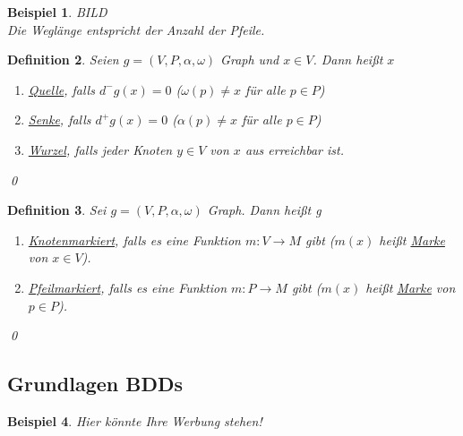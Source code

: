 \documentclass[ngerman]{scrartcl}
\theoremstyle{custom}
\newtheorem{mdef}{Definition} \numberwithin{mdef}{subsection}
\newtheorem{mex}[mdef]{Beispiel}
\newcommand{\0}{\mathbf{0}}
\newcommand{\1}{\mathbf{L}}
\begin{document}
\begin{mex}
BILD\\
Die Wegl\"ange entspricht der Anzahl der Pfeile.
\end{mex}

\begin{mdef}
Seien $g = (V,P,\alpha, \omega)$ Graph und $x \in V$. Dann hei\ss t
$x$
\begin{enumerate}
\item[(1)] \underline{Quelle}, falls $d^-g(x)=0$ ($\omega(p) \not = x$
  f\"ur alle $p \in P$)
\item[(2)] \underline{Senke}, falls $d^+g(x)=0$ ($\alpha(p) \not = x$
  f\"ur alle $p \in P$)
\item[(3)] \underline{Wurzel}, falls jeder Knoten $y \in V$ von $x$
  aus erreichbar ist.
\end{enumerate}
\qed
\end{mdef}

\begin{mdef}
Sei $g = (V,P, \alpha, \omega)$ Graph. Dann hei\ss t g
\begin{enumerate}
\item[(1)] \underline{Knotenmarkiert}, falls es eine Funktion $m: V
  \rightarrow M$ gibt ($m(x)$ hei\ss t \underline{Marke} von $x \in
  V$).
\item[(2)] \underline{Pfeilmarkiert}, falls es eine Funktion $m: P
  \rightarrow M$ gibt ($m(x)$ hei\ss t \underline{Marke} von $p \in P$).
\end{enumerate}
\qed
\end{mdef}

\subsection{Grundlagen BDDs}

\begin{mex} \label{mex221}
Hier k\"onnte Ihre Werbung stehen!
\end{mex}
\end{document}
